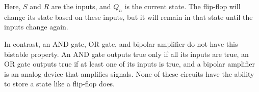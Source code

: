 Here, \( S \) and \( R \) are the inputs, and \( Q_n \) is the current state. The flip-flop will change its state based on these inputs, but it will remain in that state until the inputs change again.

In contrast, an AND gate, OR gate, and bipolar amplifier do not have this bistable property. An AND gate outputs true only if all its inputs are true, an OR gate outputs true if at least one of its inputs is true, and a bipolar amplifier is an analog device that amplifies signals. None of these circuits have the ability to store a state like a flip-flop does.

